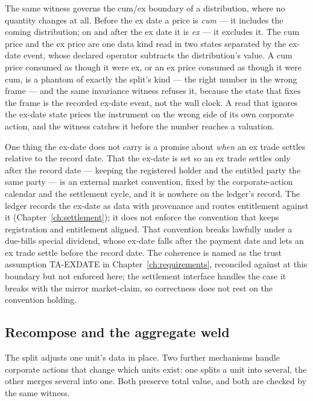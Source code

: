 The same witness governs the cum/ex boundary of a distribution, where no quantity changes
at all. Before the ex date a price is \emph{cum} --- it includes the coming distribution;
on and after the ex date it is \emph{ex} --- it excludes it. The cum price and the ex price
are one data kind read in two states separated by the ex-date event, whose declared
operator subtracts the distribution's value. A cum price consumed as though it were ex, or
an ex price consumed as though it were cum, is a phantom of exactly the split's kind ---
the right number in the wrong frame --- and the same invariance witness refuses it, because
the state that fixes the frame is the recorded ex-date event, not the wall clock. A read
that ignores the ex-date state prices the instrument on the wrong side of its own corporate
action, and the witness catches it before the number reaches a valuation.

One thing the ex-date does not carry is a promise about \emph{when} an ex trade settles
relative to the record date. That the ex-date is set so an ex trade settles only after the
record date --- keeping the registered holder and the entitled party the same party --- is
an external market convention, fixed by the corporate-action calendar and the settlement
cycle, and it is nowhere on the ledger's record. The ledger records the ex-date as data
with provenance and routes entitlement against it (Chapter~\ref{ch:settlement}); it does not
enforce the convention that keeps registration and entitlement aligned. That convention
breaks lawfully under a due-bills special dividend, whose ex-date falls after the payment
date and lets an ex trade settle before the record date. The coherence is named as the
trust assumption TA-EXDATE in Chapter~\ref{ch:requirements}, reconciled against at this
boundary but not enforced here; the settlement interface handles the case it breaks with the
mirror market-claim, so correctness does not rest on the convention holding.

\subsection{Recompose and the aggregate weld}\label{sec:recompose}

The split adjusts one unit's data in place. Two further mechanisms handle corporate actions
that change which units exist: one splits a unit into several, the other merges several into
one. Both preserve total value, and both are checked by the same witness.

